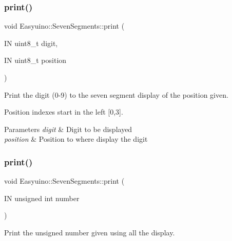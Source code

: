 \mbox{\label{class_easyuino_1_1_seven_segments_a2cf9ed0d697624b5e0aa49990aba7761}} 
\subsubsection{\texorpdfstring{print()}{print()}\hspace{0.1cm}{\footnotesize\ttfamily [1/4]}}
{\footnotesize\ttfamily void Easyuino\+::\+Seven\+Segments\+::print (\begin{DoxyParamCaption}\item[{IN uint8\+\_\+t}]{digit,  }\item[{IN uint8\+\_\+t}]{position }\end{DoxyParamCaption})}



Print the digit (0-\/9) to the seven segment display of the position given. 

Position indexes start in the left \mbox{[}0,3\mbox{]}. 
\begin{DoxyParams}{Parameters}
{\em digit} & Digit to be displayed \\
\hline
{\em position} & Position to where display the digit \\
\hline
\end{DoxyParams}
\mbox{\label{class_easyuino_1_1_seven_segments_a8eb94343f8787f95ccc9c280017ffcd9}} 
\subsubsection{\texorpdfstring{print()}{print()}\hspace{0.1cm}{\footnotesize\ttfamily [2/4]}}
{\footnotesize\ttfamily void Easyuino\+::\+Seven\+Segments\+::print (\begin{DoxyParamCaption}\item[{IN unsigned int}]{number }\end{DoxyParamCaption})}



Print the unsigned number given using all the display. 

